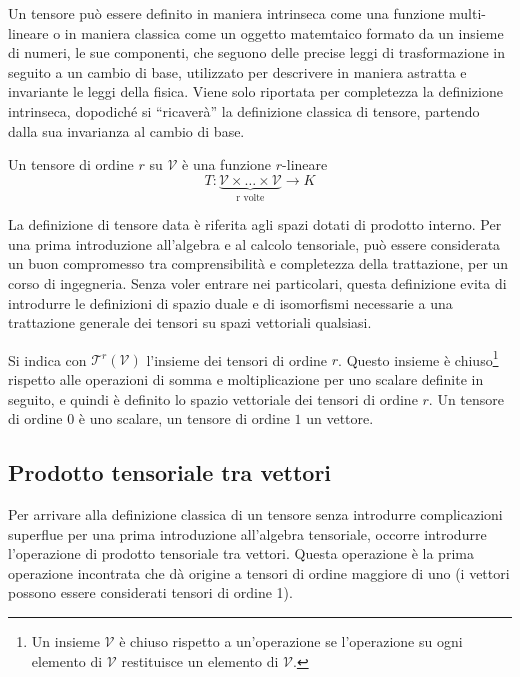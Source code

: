 Un tensore può essere definito in maniera intrinseca come una funzione multi-lineare o in maniera classica come un oggetto matemtaico formato da un insieme di numeri, le sue componenti, che seguono delle precise leggi di trasformazione in seguito a un cambio di base, utilizzato per descrivere in maniera astratta e invariante le leggi della fisica.
Viene solo riportata per completezza la definizione intrinseca, dopodiché si ``ricaverà'' la definizione classica di tensore, partendo dalla sua invarianza al cambio di base. 
\begin{definition}\label{def:tensIntrinseca}
 Un tensore di ordine $r$ su $\mathcal{V}$ è una funzione
 $r$-lineare
\begin{equation}
   T : \underbrace{\mathcal{V}   \times \dots \times \mathcal{V}  }_{\text{r volte}} \rightarrow K
\end{equation}
%
\begin{remark}
 La definizione di tensore data è riferita agli spazi dotati di prodotto interno. Per una prima introduzione all'algebra e al calcolo tensoriale, può essere considerata un buon compromesso tra comprensibilità e completezza della trattazione, per un corso di ingegneria. Senza voler entrare nei particolari, questa definizione evita di introdurre le definizioni di spazio duale e di isomorfismi necessarie a una trattazione generale dei tensori su spazi vettoriali qualsiasi.
\end{remark}
%
  Si indica con $\mathcal{T}^r(\mathcal{V})$ l'insieme dei tensori di ordine $r$. Questo insieme è chiuso\footnote{Un insieme $\mathcal{V}$ è chiuso rispetto a un'operazione se l'operazione su ogni elemento di $\mathcal{V}$ restituisce un elemento di $\mathcal{V}$.} rispetto alle operazioni di somma e moltiplicazione per uno scalare definite in seguito, e quindi è definito lo spazio vettoriale dei tensori di ordine $r$. %
 Un tensore di ordine $0$ è uno scalare, un tensore di ordine $1$ un vettore.
\end{definition}


\subsection{Prodotto tensoriale tra vettori}
Per arrivare alla definizione classica di un tensore senza introdurre complicazioni superflue per una prima introduzione all'algebra tensoriale, occorre introdurre l'operazione di prodotto tensoriale tra vettori. Questa operazione è la prima operazione incontrata che dà origine a tensori di ordine maggiore di uno (i vettori possono essere considerati tensori di ordine 1).

